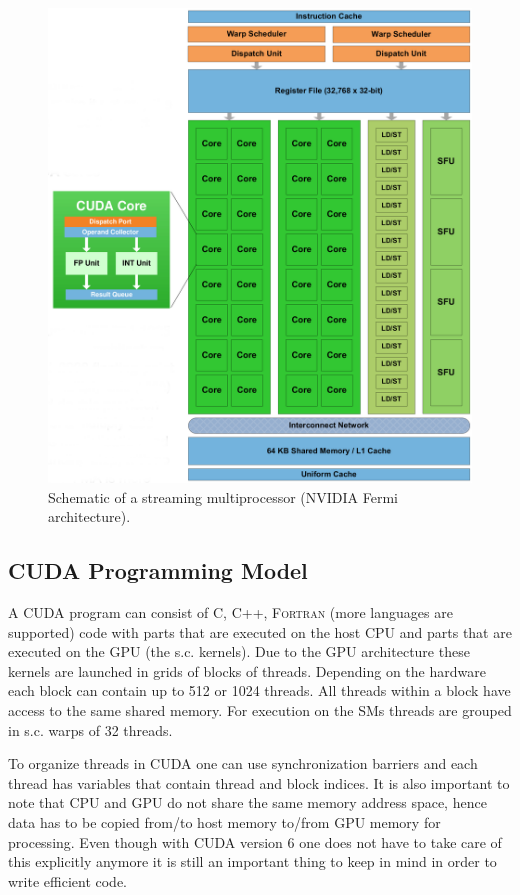 \documentclass[paper=a4, fontsize=11pt]{scrartcl} %
\numberwithin{equation}{section} %
\numberwithin{figure}{section} %
\numberwithin{table}{section} %
\begin{document}
\begin{figure}
\centering
\includegraphics[width=.8\linewidth]{images/fermi_sm.png}
\caption{Schematic of a streaming multiprocessor (NVIDIA Fermi architecture)\cite{gpu_nvidia_fermi}.}
\label{fig:fermi_sm}
\end{figure}

\subsection{CUDA Programming Model}
A CUDA program can consist of \textsc{C}, \textsc{C++}, \textsc{Fortran} (more languages are supported) code with parts that are executed on the host CPU and parts that are executed on the GPU (the s.c. kernels). Due to the GPU architecture these kernels are launched in grids of blocks of threads. Depending on the hardware each block can contain up to 512 or 1024 threads. All threads within a block have access to the same shared memory. For execution on the SMs threads are grouped in s.c. warps of 32 threads.

To organize threads in CUDA one can use synchronization barriers and each thread has variables that contain thread and block indices. It is also important to note that CPU and GPU do not share the same memory address space, hence data has to be copied from/to host memory to/from GPU memory for processing. Even though with CUDA version 6 one does not have to take care of this explicitly anymore it is still an important thing to keep in mind in order to write efficient code.
\end{document}
